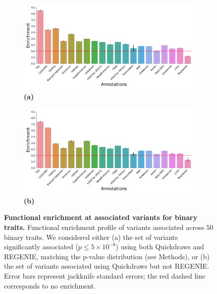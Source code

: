 \begin{figure}[h!]
    \centering
    \begin{subfigure}{0.5\textwidth}
    \captionsetup{justification=raggedright,singlelinecheck=false}
    \caption*{\textbf{(a)}}
    \includegraphics[width=\textwidth]{figures/functional/annotation_both_binary.pdf}
    \end{subfigure}%
    \begin{subfigure}{0.5\textwidth}
    \captionsetup{justification=raggedright,singlelinecheck=false}
    \caption*{\textbf{(b)}}
    \includegraphics[width=\textwidth]{figures/functional/annotation_onlyqd_binary.pdf}
    \end{subfigure}
    \caption{\textbf{Functional enrichment at associated variants for binary traits.}
    Functional enrichment profile of variants associated across $50$ binary traits.
    We considered either (a) the set of variants significantly associated ($p \leq 5 \times 10^{-8}$) using both Quickdraws and REGENIE, matching the p-value distribution (see Methods), or (b) the set of variants associated using Quickdraws but not REGENIE.
    Error bars represent jackknife standard errors; the red dashed line corresponds to no enrichment.
    }
    \label{fig:functional_bt}
\end{figure}

